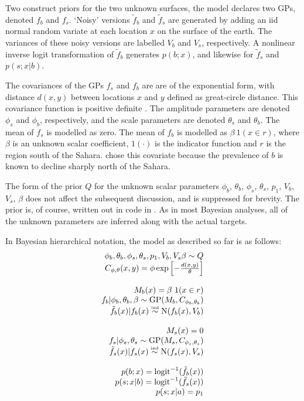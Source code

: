 \documentclass[article]{jss}
\begin{document}
Two construct priors for the two unknown surfaces, the model declares two GPs, denoted $f_b$ and $f_s$. `Noisy' versions $\tilde f_b$ and $\tilde f_s$ are generated by adding an iid normal random variate at each location $x$ on the surface of the earth. The variances of these noisy versions are labelled $V_b$ and $V_s$, respectively. A nonlinear inverse logit transformation of $\tilde f_b$ generates $p(b;x)$, and likewise for $\tilde f_s$ and $p(s;x|b)$.

The covariances of the GPs $f_s$ and $f_b$ are are of the exponential form, with distance $d(x,y)$ between locations $x$ and $y$ defined as great-circle distance. This covariance function is positive definite \citep{spherical-validity}. The amplitude parameters are denoted $\phi_s$ and $\phi_b$, respectively, and the scale parameters are denoted $\theta_s$ and $\theta_b$. The mean of $f_s$ is modelled as zero. The mean of $f_b$ is modelled as $\beta\ 1(x\in r)$, where $\beta$ is an unknown scalar coefficient, $1(\cdot)$ is the indicator function and $r$ is the region south of the Sahara. \cite{Howes} chose this covariate because the prevalence of $b$ is known to decline sharply north of the Sahara.

The form of the prior $Q$ for the unknown scalar parameters $\phi_b$, $\theta_b$, $\phi_s$, $\theta_s$, $p_1$, $V_b$, $V_s$, $\beta$ does not affect the subsequent discussion, and is suppressed for brevity. The prior is, of course, written out in code in . As in most Bayesian analyses, all of the unknown parameters are inferred along with the actual targets. 

In Bayesian hierarchical notation, the model as described so far is as follows:
\begin{equation}
    \label{eq:duffy-model} 
    \begin{array}{r}
        \phi_b,\theta_b,\phi_s,\theta_s,p_1,V_b,V_s\beta\sim Q\\
        C_{\phi,\theta}(x,y)=\phi\exp\left[{-\frac{d(x,y)}{\theta}}\right]\\\\
        M_b(x) = \beta\ 1(x\in r)\\
        f_b|\phi_b,\theta_b,\beta\sim \textup{GP}(M_b, C_{\phi_b,\theta_b}) \\
        \tilde f_b(x) | f_b(x) \stackrel{\textup{\tiny ind}}{\sim} \textup{N}(f_b(x),V_b) \\\\
        M_s(x) = 0\\
        f_s|\phi_s,\theta_s\sim \textup{GP}(M_s, C_{\phi_s,\theta_s})\\
        \tilde f_s(x) | f_s(x) \stackrel{\textup{\tiny ind}}{\sim} \textup{N}(f_s(x),V_s)\\\\
        p(b;x) = \textup{logit}^{-1}(\tilde f_b(x))\\
        p(s;x|b)= \textup{logit}^{-1}(\tilde f_s(x))\\
        p(s;x|a)= p_1
    \end{array}
\end{equation}  
\end{document}
